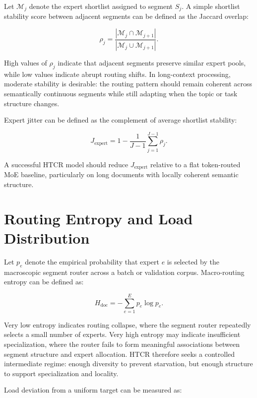 Let $\mathcal{M}_j$ denote the expert shortlist assigned to segment $S_j$. A simple shortlist stability score between adjacent segments can be defined as the Jaccard overlap:

\begin{equation}
\rho_j =
\frac{|\mathcal{M}_j \cap \mathcal{M}_{j+1}|}
{|\mathcal{M}_j \cup \mathcal{M}_{j+1}|}.
\end{equation}

High values of $\rho_j$ indicate that adjacent segments preserve similar expert pools, while low values indicate abrupt routing shifts. In long-context processing, moderate stability is desirable: the routing pattern should remain coherent across semantically continuous segments while still adapting when the topic or task structure changes.

Expert jitter can be defined as the complement of average shortlist stability:

\begin{equation}
J_{\text{expert}} =
1 -
\frac{1}{J-1}
\sum_{j=1}^{J-1}
\rho_j.
\end{equation}

A successful HTCR model should reduce $J_{\text{expert}}$ relative to a flat token-routed MoE baseline, particularly on long documents with locally coherent semantic structure.

\section{Routing Entropy and Load Distribution}

Let $p_e$ denote the empirical probability that expert $e$ is selected by the macroscopic segment router across a batch or validation corpus. Macro-routing entropy can be defined as:

\begin{equation}
H_{\text{doc}} =
-\sum_{e=1}^{E} p_e \log p_e.
\end{equation}

Very low entropy indicates routing collapse, where the segment router repeatedly selects a small number of experts. Very high entropy may indicate insufficient specialization, where the router fails to form meaningful associations between segment structure and expert allocation. HTCR therefore seeks a controlled intermediate regime: enough diversity to prevent starvation, but enough structure to support specialization and locality.

Load deviation from a uniform target can be measured as:

